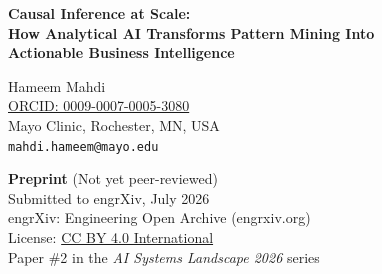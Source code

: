 \documentclass[12pt, a4paper]{article}
\begin{document}
\begin{center}
    {\Large\bfseries Causal Inference at Scale:\\[4pt]
    How Analytical AI Transforms Pattern Mining Into\\[2pt]
    Actionable Business Intelligence}

    \vspace{1em}

    {\large Hameem Mahdi}\\[2pt]
    {\small \href{https://orcid.org/0009-0007-0005-3080}{ORCID: 0009-0007-0005-3080}}\\[4pt]
    Mayo Clinic, Rochester, MN, USA\\
    \texttt{mahdi.hameem@mayo.edu}

    \vspace{1em}

    {\small\textbf{Preprint} (Not yet peer-reviewed)}\\[2pt]
    {\small Submitted to engrXiv, July 2026}\\[2pt]
    {\small engrXiv: Engineering Open Archive (engrxiv.org)}\\[2pt]
    {\small License: \href{https://creativecommons.org/licenses/by/4.0/}{CC BY 4.0 International}}\\[2pt]
    {\small Paper \#2 in the \emph{AI Systems Landscape 2026} series}
\end{center}

\vspace{1em}
\end{document}
